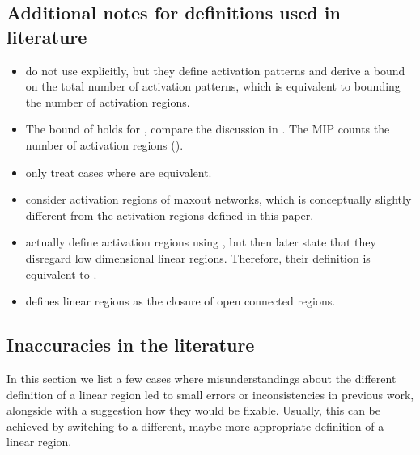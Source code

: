 \documentclass{article}
\begin{document}
\subsection{Additional notes for definitions used in literature}
\label{sec:additional_table_notes}
\begin{itemize}
    \item \citet{raghu2017expressive} do not use  explicitly, but they define activation patterns and derive a bound on the total number of activation patterns, which is equivalent to bounding the number of activation regions.
    \item The bound of \citet{serra2018bounding} holds for , compare the discussion in \citep[Section 5]{cai2023getting}. The MIP counts the number of activation regions ().
    \item \citet{rolnick2020reverse} only treat cases where  are equivalent.
    \item \citet{tseran2021expected} consider activation regions of maxout networks, which is conceptually slightly different from the activation regions defined in this paper.
    \item \citet{huchette2023deep} actually define activation regions using , but then later state that they disregard low dimensional linear regions. Therefore, their definition is equivalent to .
    \item \citet{zanotti2025linear} defines linear regions as the closure of open connected regions.
\end{itemize}
\subsection{Inaccuracies in the literature}
\label{sec:flaws}
In this section we list a few cases where misunderstandings about the different definition of a linear region led to small errors or inconsistencies in previous work, alongside with a suggestion how they would be fixable. Usually, this can be achieved by switching to a different, maybe more appropriate definition of a linear region.
\end{document}
